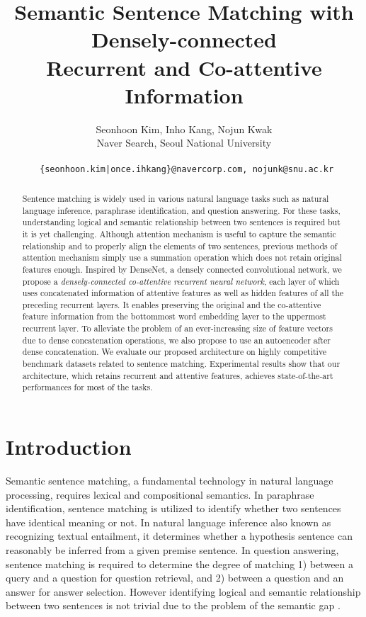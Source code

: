 \documentclass[letterpaper]{article} \usepackage{aaai19}  \usepackage{times}  \usepackage{helvet}  \usepackage{courier}  \usepackage{url}  \usepackage{graphicx}  \frenchspacing  \setlength{\pdfpagewidth}{8.5in}  \setlength{\pdfpageheight}{11in}
\newcommand\shh[1]{\textcolor{black}{#1}}
\begin{document}
\title{Semantic Sentence Matching with Densely-connected\\ Recurrent and Co-attentive Information
}
\author{  
Seonhoon Kim, Inho Kang, Nojun Kwak  \\
Naver Search, Seoul National University\\
\\
\texttt{ \{seonhoon.kim|once.ihkang\}@navercorp.com, nojunk@snu.ac.kr} \\
}
\maketitle

\begin{abstract}
Sentence matching is widely used in various natural language tasks such as natural language inference, paraphrase identification, and question answering. For these tasks, understanding logical and semantic relationship between two sentences is required but it is yet challenging. Although attention mechanism is useful to capture the semantic relationship and to properly align the elements of two sentences, previous methods of attention mechanism simply use a summation operation which does not retain original features enough. Inspired by DenseNet, a densely connected convolutional network, we propose a \textit{densely-connected co-attentive recurrent neural network}, each layer of which uses concatenated information of attentive features as well as hidden features of all the preceding recurrent layers. It enables preserving the original and the co-attentive feature information from the bottommost word embedding layer to the uppermost recurrent layer. To alleviate the problem of an ever-increasing size of feature vectors due to dense concatenation operations, we also propose to use an autoencoder after dense concatenation. We evaluate our proposed architecture on highly competitive benchmark datasets related to sentence matching. Experimental results show that our architecture, which retains recurrent and attentive features, achieves state-of-the-art performances for 
\shh{most of} the tasks.
\end{abstract}


\section{Introduction}

Semantic sentence matching, a fundamental technology in natural language processing, 
requires lexical and compositional semantics.
In paraphrase identification, sentence matching is utilized to identify whether two sentences have identical meaning or not. In natural language inference also known as recognizing textual entailment, it determines whether a hypothesis sentence can reasonably be inferred from a given premise sentence. In question answering, sentence matching is required to determine the degree of matching 1) between a query and a question for question retrieval, and 2) between a question and an answer for answer selection. However identifying logical and semantic relationship between two sentences is not trivial due to the problem of the semantic gap \cite{liu2016deep}.
\end{document}
